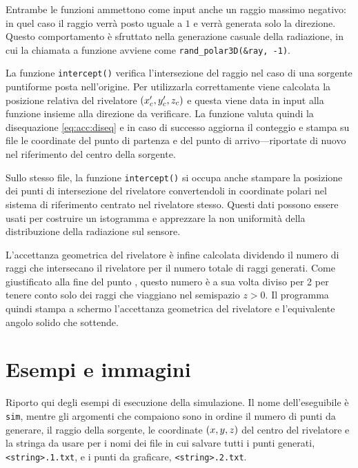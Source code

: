         Entrambe le funzioni ammettono come input anche un raggio massimo negativo: in quel caso il raggio verrà posto uguale a $1$ e verrà generata solo la direzione. Questo comportamento è sfruttato nella generazione casuale della radiazione, in cui la chiamata a funzione avviene come \verb|rand_polar3D(&ray, -1)|.
        
        La funzione \verb|intercept()| verifica l'intersezione del raggio nel caso di una sorgente puntiforme posta nell'origine. Per utilizzarla correttamente viene calcolata la posizione relativa del rivelatore $\pqty{x_c', y_c', z_c}$ e questa viene data in input alla funzione insieme alla direzione da verificare. La funzione valuta quindi la disequazione \eqref{eq:acc:diseq} e in caso di successo aggiorna il conteggio e stampa su file le coordinate del punto di partenza e del punto di arrivo---riportate di nuovo nel riferimento del centro della sorgente.
        

        Sullo stesso file, la funzione \verb|intercept()| si occupa anche stampare la posizione dei punti di intersezione del rivelatore convertendoli in coordinate polari nel sistema di riferimento centrato nel rivelatore stesso. Questi dati possono essere usati per costruire un istogramma e apprezzare la non uniformità della distribuzione della radiazione sul sensore.

        L'accettanza geometrica del rivelatore è infine calcolata dividendo il numero di raggi che intersecano il rivelatore per il numero totale di raggi generati. Come giustificato alla fine del punto , questo numero è a sua volta diviso per \num{2} per tenere conto solo dei raggi che viaggiano nel semispazio $z > 0$. Il programma quindi stampa a schermo l'accettanza geometrica del rivelatore e l'equivalente angolo solido che sottende.

    \section{Esempi e immagini}
        Riporto qui degli esempi di esecuzione della simulazione. Il nome dell'eseguibile è \verb|sim|, mentre gli argomenti che compaiono sono in ordine il numero di punti da generare, il raggio della sorgente, le coordinate $\pqty{x,y,z}$ del centro del rivelatore e la stringa da usare per i nomi dei file in cui salvare tutti i punti generati, \verb|<string>.1.txt|, e i punti da graficare, \verb|<string>.2.txt|.

